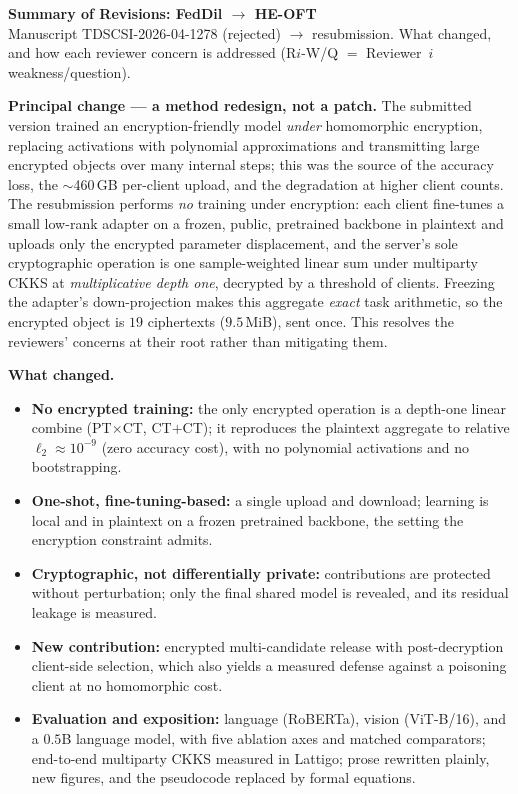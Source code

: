 \documentclass[10pt]{article}
\newcommand{\rc}[1]{\textbf{#1}}
\begin{document}
{\large\bfseries Summary of Revisions: FedDil $\rightarrow$ HE-OFT}\\[1pt]
{\footnotesize Manuscript TDSCSI-2026-04-1278 (rejected) $\rightarrow$ resubmission. What changed, and how each
reviewer concern is addressed (R$i$-W/Q $=$ Reviewer~$i$ weakness/question).}

\textbf{Principal change --- a method redesign, not a patch.} The submitted version trained an
encryption-friendly model \emph{under} homomorphic encryption, replacing activations with polynomial
approximations and transmitting large encrypted objects over many internal steps; this was the source of the
accuracy loss, the $\sim$460\,GB per-client upload, and the degradation at higher client counts. The
resubmission performs \emph{no} training under encryption: each client fine-tunes a small low-rank adapter on a
frozen, public, pretrained backbone in plaintext and uploads only the encrypted parameter displacement, and the
server's sole cryptographic operation is one sample-weighted linear sum under multiparty CKKS at
\emph{multiplicative depth one}, decrypted by a threshold of clients. Freezing the adapter's down-projection
makes this aggregate \emph{exact} task arithmetic, so the encrypted object is $19$ ciphertexts ($9.5$\,MiB),
sent once. This resolves the reviewers' concerns at their root rather than mitigating them.

\textbf{What changed.}
\begin{itemize}
\item \rc{No encrypted training:} the only encrypted operation is a depth-one linear combine (PT$\times$CT,
CT$+$CT); it reproduces the plaintext aggregate to relative $\ell_2\!\approx\!10^{-9}$ (zero accuracy cost),
with no polynomial activations and no bootstrapping.
\item \rc{One-shot, fine-tuning-based:} a single upload and download; learning is local and in plaintext on a
frozen pretrained backbone, the setting the encryption constraint admits.
\item \rc{Cryptographic, not differentially private:} contributions are protected without perturbation; only
the final shared model is revealed, and its residual leakage is measured.
\item \rc{New contribution:} encrypted multi-candidate release with post-decryption client-side selection,
which also yields a measured defense against a poisoning client at no homomorphic cost.
\item \rc{Evaluation and exposition:} language (RoBERTa), vision (ViT-B/16), and a $0.5$B language model, with
five ablation axes and matched comparators; end-to-end multiparty CKKS measured in Lattigo; prose rewritten
plainly, new figures, and the pseudocode replaced by formal equations.
\end{itemize}
\end{document}
